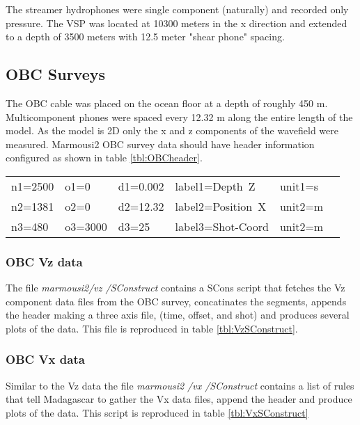 The streamer hydrophones 
were single component (naturally) and recorded only pressure.  The VSP was located at 10300 meters in the x direction and extended to a depth of 3500 meters with 12.5 
meter "shear phone" spacing.

\subsection{OBC Surveys}
The OBC cable was placed on the ocean floor at a depth of roughly 450 m.  Multicomponent phones were spaced every 12.32 m along the
entire length of the model.  As the model is 2D only the x and z components of the wavefield were measured.  
Marmousi2 OBC survey data should have header information configured as shown in table \ref{tbl:OBCheader}.

{
\begin{tabular}[t]{|llllll|}
        \hline
        n1=2500    &   o1=0     &   d1=0.002    &    label1=Depth\ Z     &  unit1=s  &  \\
        n2=1381    &   o2=0     &   d2=12.32    &    label2=Position\ X  &  unit2=m  &  \\
	n3=480 	   &   o3=3000  &   d3=25	&    label3=Shot-Coord   &  unit2=m  &  \\
        \hline
\end{tabular}
}


\subsubsection{OBC Vz data}
The file \emph{marmousi2\slash vz \slash SConstruct} contains a SCons script that fetches the Vz component
data files from the OBC survey, concatinates the segments, appends the header making a 
three axis file, (time, offset, and shot) and produces several plots of the data.  This file is reproduced in table 
\ref{tbl:VzSConstruct}.  

{
\tiny

\normalsize
}

\subsubsection{OBC Vx data}
Similar to the Vz data the file \emph{marmousi2 \slash vx \slash SConstruct} contains a list of rules that tell
Madagascar to gather the Vx data files, append the header and produce plots of the data.  This script is reproduced 
in table \ref{tbl:VxSConstruct}
{
\tiny

\normalsize
}


